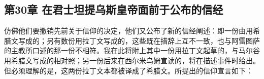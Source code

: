 
\subsection{第30章 在君士坦提乌斯皇帝面前于公布的信经}

仿佛他们要撤销先前关于信仰的决定，他们又公布了新的信经阐述：即一份由用希腊文写成的；另有数份用拉丁文写成的，这些既在措辞上互不一致，也与阿雷图萨的主教所口述的那一份不相符。我在此将附上其中一份用拉丁文起草的，与马尔谷用希腊文写成的相对照；另一份后来在西尔米乌姆宣读的，将在描述事件时给出。但必须理解的是，这两份拉丁文本都被译成了希腊文。所提出的信仰宣言如下：\par

